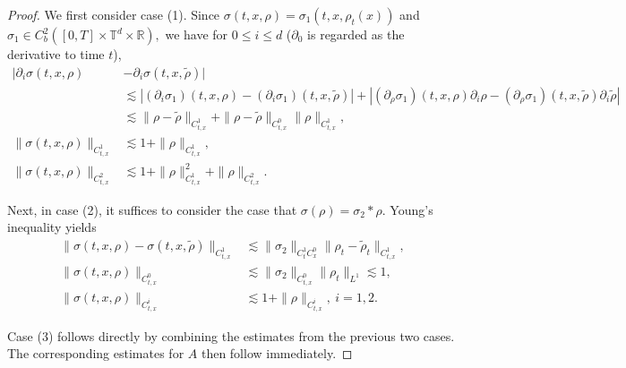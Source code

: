 \documentclass[10pt,a4paper]{amsart}
\numberwithin{equation}{section}
\def\leq{\leqslant}
\def\leq{\leqslant}
\begin{document}
\begin{proof}
We first consider case \textnormal{(1)}. Since
$
\sigma(t,x,\rho)=\sigma_1(t,x,\rho_t(x))
$
and
$
\sigma_1\in C_b^2([0,T]\times\mathbb{T}^d\times\mathbb{R}),
$
we have for $0\leq i\leq d$ ($\partial_0$ is regarded as the derivative  to  time  $t$), 
\begin{align*}
|\partial_i\sigma(t,x,\rho)&-\partial_i\sigma(t,x,\tilde{\rho})|\\
&\lesssim|(\partial_i\sigma_1)(t,x,\rho)-(\partial_i\sigma_1)(t,x,\tilde{\rho})|+|(\partial_\rho\sigma_1)(t,x,\rho)\partial_i\rho-(\partial_\rho\sigma_1)(t,x,\tilde{\rho})\partial_i\tilde\rho|\\
&\lesssim 
\|\rho- \tilde{\rho} \|_{C_{t,x}^1}+\|\rho- \tilde{\rho} \|_{C_{t,x}^0}\|\rho \|_{C_{t,x}^1},
\\
\|\sigma(t,x,\rho)\|_{C_{t,x}^1}
&\lesssim
1+\|\rho\|_{C_{t,x}^1},\\
\|\sigma(t,x,\rho)\|_{C_{t,x}^2}
&\lesssim
1+\|\rho\|_{C_{t,x}^1}^2+\|\rho\|_{C_{t,x}^2}.
\end{align*}

Next, in case \textnormal{(2)}, it suffices to consider the case that $\sigma(\rho)=\sigma_2*\rho$. Young's inequality yields
\begin{align*}
\|\sigma(t,x,\rho)-\sigma(t,x,\tilde{\rho})\|_{C_{t,x}^1}
&\lesssim
\|\sigma_2\|_{C_{t}^1C_{x}^0}
\|\rho_t-\tilde{\rho}_t\|_{C_{t,x}^1},
\\
\|\sigma(t,x,\rho)\|_{C_{t,x}^0}
&\lesssim
\|\sigma_2\|_{C_{t,x}^0}\|\rho_t\|_{L^1}
\lesssim 1,
\\
\|\sigma(t,x,\rho)\|_{C_{t,x}^i}
&\lesssim
1+\|\rho\|_{C_{t,x}^i},\ i=1,2.
\end{align*}

Case \textnormal{(3)} follows directly by combining the estimates from the previous two cases.
The corresponding estimates for $A$ then follow immediately.
\end{proof}
\end{document}
